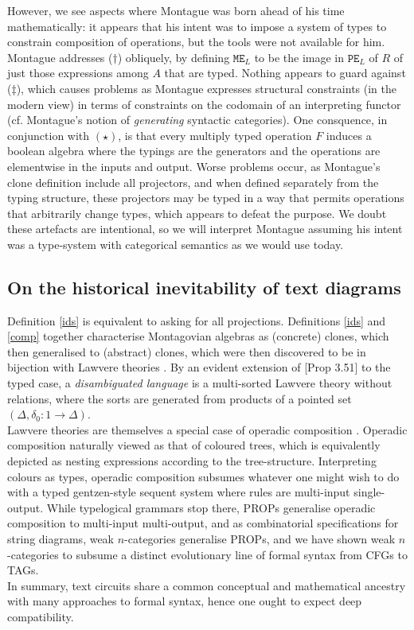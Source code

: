 However, we see aspects where Montague was born ahead of his time mathematically: it appears that his intent was to impose a system of types to constrain composition of operations, but the tools were not available for him. Montague addresses ($\dag$) obliquely, by defining $\texttt{ME}_L$ to be the image in $\texttt{PE}_L$ of $R$ of just those expressions among $A$ that are typed. Nothing appears to guard against ($\ddag$), which causes problems as Montague expresses structural constraints (in the modern view) in terms of constraints on the codomain of an interpreting functor (cf. Montague's notion of \emph{generating} syntactic categories). One consquence, in conjunction with $(\star)$, is that every multiply typed operation $F$ induces a boolean algebra where the typings are the generators and the operations are elementwise in the inputs and output. Worse problems occur, as Montague's clone definition include all projectors, and when defined separately from the typing structure, these projectors may be typed in a way that permits operations that arbitrarily change types, which appears to defeat the purpose. We doubt these artefacts are intentional, so we will interpret Montague assuming his intent was a type-system with categorical semantics as we would use today.

\subsection{On the historical inevitability of text diagrams}

Definition \ref{ids} is equivalent to asking for all projections. Definitions \ref{ids} and \ref{comp} together characterise Montagovian algebras as (concrete) clones, which then generalised to (abstract) clones, which were then discovered to be in bijection with Lawvere theories \citep{kerkhoff_short_2014}. By an evident extension of [Prop 3.51] to the typed case, a \emph{disambiguated language} is a multi-sorted Lawvere theory without relations, where the sorts are generated from products of a pointed set $(\Delta, \delta_0 : 1 \rightarrow \Delta)$.\\

Lawvere theories are themselves a special case of operadic composition \citep{yau_colored_2016}. Operadic composition naturally viewed as that of coloured trees, which is equivalently depicted as nesting expressions according to the tree-structure. Interpreting colours as types, operadic composition subsumes whatever one might wish to do with a typed gentzen-style sequent system where rules are multi-input single-output. While typelogical grammars stop there, PROPs generalise operadic composition to multi-input multi-output, and as combinatorial specifications for string diagrams, weak $n$-categories generalise PROPs, and we have shown weak $n$-categories to subsume a distinct evolutionary line of formal syntax from CFGs to TAGs.\\

In summary, text circuits share a common conceptual and mathematical ancestry with many approaches to formal syntax, hence one ought to expect deep compatibility.